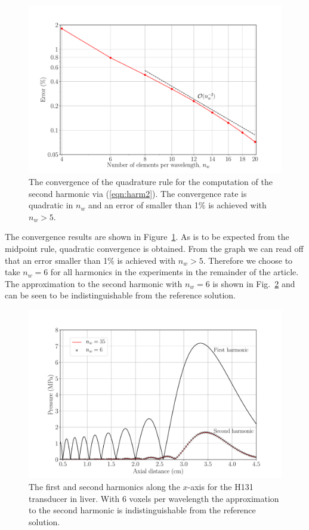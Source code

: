 \documentclass[11pt]{article}
\numberwithin{equation}{section}
\begin{document}
\begin{figure}[h!]
    \centering
    \includegraphics[width=\linewidth]{Figure3.pdf}
    \caption{The convergence of the quadrature rule for the computation of the 
    second harmonic via (\ref{eqn:harm2}). The convergence rate is quadratic
    in $n_w$ and an error of smaller than 1\% is achieved with $n_w>5$.}
    \label{fig:conv_quad}
\end{figure}
The convergence results are shown in Figure~\ref{fig:conv_quad}. As is to be 
expected from the midpoint rule, quadratic convergence is obtained. From the graph 
we can read off that an error smaller than 1\% is achieved with $n_w>5$. 
Therefore we choose to take $n_w=6$ for all harmonics in the experiments in the remainder of the 
article. The approximation to the second harmonic with $n_w=6$ is shown in
Fig.~\ref{fig:p2_quad} and can be seen to be indistinguishable from the
reference solution.
\begin{figure}[h!]
    \centering
    \includegraphics[width=\linewidth]{Figure4.pdf}
    \caption{The first and second harmonics along the $x$-axis for the H131 
    transducer in liver. With 6 voxels per wavelength the approximation to the 
    second harmonic is indistinguishable from the reference solution.}
    \label{fig:p2_quad}
\end{figure}
\end{document}
